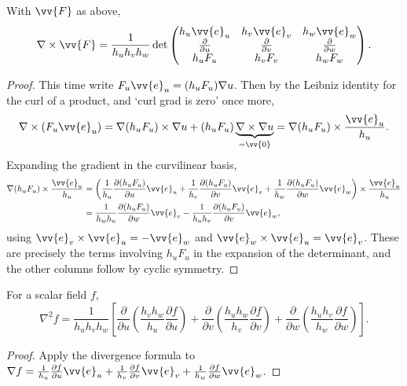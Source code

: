 \begin{proposition}
	With $\vv{F}$ as above,
	$$
	\nabla \times \vv{F} = \frac{1}{h_u h_v h_w} \det \begin{pmatrix}
		h_u \vv{e}_u & h_v \vv{e}_v & h_w \vv{e}_w \\
		\frac{\partial}{\partial u} & \frac{\partial}{\partial v} & \frac{\partial}{\partial w} \\
		h_u F_u & h_v F_v & h_w F_w
	\end{pmatrix}.
	$$
\end{proposition}
\begin{proof}
	This time write $F_u \vv{e}_u = (h_u F_u) \nabla u$. Then by the Leibniz identity for the curl of a product, and `curl grad is zero' once more,
	$$
	\nabla \times (F_u \vv{e}_u) = \nabla (h_u F_u) \times \nabla u + (h_u F_u) \underbrace{\nabla \times \nabla u}_{= \vv{0}} = \nabla(h_u F_u) \times \frac{\vv{e}_u}{h_u}.
	$$
	Expanding the gradient in the curvilinear basis,
	\begin{align*}
		\nabla(h_u F_u) \times \frac{\vv{e}_u}{h_u} &= \left(\frac{1}{h_u}\frac{\partial (h_u F_u)}{\partial u} \vv{e}_u + \frac{1}{h_v}\frac{\partial (h_u F_u)}{\partial v} \vv{e}_v + \frac{1}{h_w}\frac{\partial (h_u F_u)}{\partial w} \vv{e}_w\right) \times \frac{\vv{e}_u}{h_u} \\
		&= \frac{1}{h_w h_u} \frac{\partial(h_u F_u)}{\partial w} \vv{e}_v - \frac{1}{h_u h_v} \frac{\partial (h_u F_u)}{\partial v} \vv{e}_w,
	\end{align*}
	using $\vv{e}_v \times \vv{e}_u = -\vv{e}_w$ and $\vv{e}_w \times \vv{e}_u = \vv{e}_v$. These are precisely the terms involving $h_u F_u$ in the expansion of the determinant, and the other columns follow by cyclic symmetry.
\end{proof}

\begin{corollary}
	For a scalar field $f$,
	$$
	\nabla^2 f = \frac{1}{h_u h_v h_w}\left[\frac{\partial}{\partial u}\left(\frac{h_v h_w}{h_u} \frac{\partial f}{\partial u}\right) + \frac{\partial}{\partial v}\left(\frac{h_u h_w}{h_v} \frac{\partial f}{\partial v}\right) + \frac{\partial}{\partial w}\left(\frac{h_u h_v}{h_w} \frac{\partial f}{\partial w}\right)\right].
	$$
\end{corollary}
\begin{proof}
	Apply the divergence formula to $\nabla f = \frac{1}{h_u}\frac{\partial f}{\partial u} \vv{e}_u + \frac{1}{h_v}\frac{\partial f}{\partial v} \vv{e}_v + \frac{1}{h_w}\frac{\partial f}{\partial w} \vv{e}_w$.
\end{proof}

